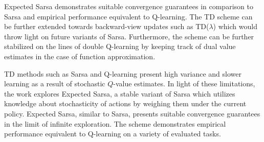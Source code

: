 \documentclass[11pt,letterpaper]{article}
\begin{document}
Expected Sarsa demonstrates suitable convergence guarantees in comparison to Sarsa and empirical performance equivalent to Q-learning. The TD scheme can be further extended towards backward-view updates such as TD($\lambda$) which would throw light on future variants of Sarsa. Furthermore, the scheme can be further stabilized on the lines of double Q-learning by keeping track of dual value estimates in the case of function approximation. 

TD methods such as Sarsa and Q-learning present high variance and slower learning as a result of stochastic $Q$-value estimates. In light of these limitations, the work explores Expected Sarsa, a stable variant of Sarsa which utilizes knowledge about stochasticity of actions by weighing them under the current policy. Expected Sarsa, similar to Sarsa, presents suitable convergence guarantees in the limit of infinite exploration. The scheme demonstrates empirical performance equivalent to Q-learning on a variety of evaluated tasks. 
\end{document}

